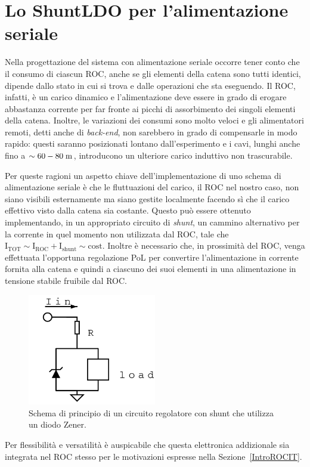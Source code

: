 \section{Lo ShuntLDO per l'alimentazione seriale}
\label{sec:SLDOzener}

Nella progettazione del sistema con alimentazione seriale occorre tener conto che il consumo di ciascun ROC, anche se gli elementi della catena sono tutti identici, dipende dallo stato in cui si trova e dalle operazioni che sta eseguendo. 
Il ROC, infatti, è un carico dinamico e l'alimentazione deve essere in grado di erogare abbastanza corrente per far fronte ai picchi di assorbimento dei singoli elementi della catena.
Inoltre, le variazioni dei consumi sono molto veloci e gli alimentatori remoti, detti anche di \textit{back-end}, non sarebbero in grado di compensarle in modo rapido: questi saranno posizionati lontano dall'esperimento e i cavi, lunghi anche fino a $\sim 60-80\rm \; m$, introducono un ulteriore carico induttivo non trascurabile.

Per queste ragioni un aspetto chiave dell'implementazione di uno schema di alimentazione seriale \`e che le fluttuazioni del carico, il ROC nel nostro caso, non siano visibili esternamente ma siano gestite localmente facendo s\`i che il carico effettivo visto dalla catena sia costante. Questo pu\`o essere ottenuto implementando, in un appropriato circuito di {\em shunt}, un cammino alternativo per la corrente in quel momento non utilizzata dal ROC, tale che $\mathrm{I}_\mathrm{TOT}\sim\mathrm{I}_\mathrm{ROC}+\mathrm{I}_\mathrm{shunt}\sim\mathrm{cost}$. Inoltre \`e necessario che, in prossimit\`a del ROC, venga effettuata l'opportuna regolazione PoL per convertire l'alimentazione in corrente fornita alla catena e quindi a ciascuno dei suoi elementi in una alimentazione in tensione stabile fruibile dal ROC. 
\begin{figure}
\centering
\includegraphics[width=0.5\textwidth]{Immagini/zener2}
\caption{Schema di principio di un circuito regolatore con shunt che utilizza un diodo Zener.}
\label{zener}
\end{figure}
Per flessibilit\`a e versatilit\`a \`e auspicabile che questa elettronica addizionale sia integrata nel ROC stesso per le motivazioni espresse nella Sezione~\ref{IntroROCIT}.

